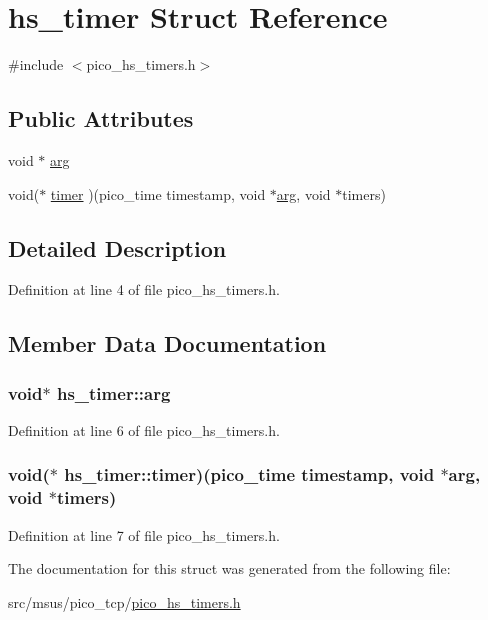 \hypertarget{strucths__timer}{\section{hs\-\_\-timer Struct Reference}
\label{strucths__timer}
}


{\ttfamily \#include $<$pico\-\_\-hs\-\_\-timers.\-h$>$}

\subsection*{Public Attributes}
\begin{DoxyCompactItemize}
\item 
void $\ast$ \hyperlink{strucths__timer_a48f30e7ff44ed1507b4d53650e1157f1}{arg}
\item 
void($\ast$ \hyperlink{strucths__timer_a5bb8945235e24aaf632948381950e319}{timer} )(pico\-\_\-time timestamp, void $\ast$\hyperlink{strucths__timer_a48f30e7ff44ed1507b4d53650e1157f1}{arg}, void $\ast$timers)
\end{DoxyCompactItemize}


\subsection{Detailed Description}


Definition at line 4 of file pico\-\_\-hs\-\_\-timers.\-h.



\subsection{Member Data Documentation}
\hypertarget{strucths__timer_a48f30e7ff44ed1507b4d53650e1157f1}{
\subsubsection[{arg}]{\setlength{\rightskip}{0pt plus 5cm}void$\ast$ hs\-\_\-timer\-::arg}}\label{strucths__timer_a48f30e7ff44ed1507b4d53650e1157f1}


Definition at line 6 of file pico\-\_\-hs\-\_\-timers.\-h.

\hypertarget{strucths__timer_a5bb8945235e24aaf632948381950e319}{
\subsubsection[{timer}]{\setlength{\rightskip}{0pt plus 5cm}void($\ast$ hs\-\_\-timer\-::timer)(pico\-\_\-time timestamp, void $\ast${\bf arg}, void $\ast$timers)}}\label{strucths__timer_a5bb8945235e24aaf632948381950e319}


Definition at line 7 of file pico\-\_\-hs\-\_\-timers.\-h.



The documentation for this struct was generated from the following file\-:\begin{DoxyCompactItemize}
\item 
src/msus/pico\-\_\-tcp/\hyperlink{pico__hs__timers_8h}{pico\-\_\-hs\-\_\-timers.\-h}\end{DoxyCompactItemize}
